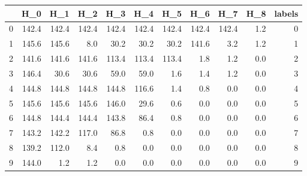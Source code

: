 \begin{tabular}{lrrrrrrrrrr}
\toprule
{} &    H\_0 &    H\_1 &    H\_2 &    H\_3 &    H\_4 &    H\_5 &    H\_6 &    H\_7 &  H\_8 &  labels \\
\midrule
0 &  142.4 &  142.4 &  142.4 &  142.4 &  142.4 &  142.4 &  142.4 &  142.4 &  1.2 &       0 \\
1 &  145.6 &  145.6 &    8.0 &   30.2 &   30.2 &   30.2 &  141.6 &    3.2 &  1.2 &       1 \\
2 &  141.6 &  141.6 &  141.6 &  113.4 &  113.4 &  113.4 &    1.8 &    1.2 &  0.0 &       2 \\
3 &  146.4 &   30.6 &   30.6 &   59.0 &   59.0 &    1.6 &    1.4 &    1.2 &  0.0 &       3 \\
4 &  144.8 &  144.8 &  144.8 &  144.8 &  116.6 &    1.4 &    0.8 &    0.0 &  0.0 &       4 \\
5 &  145.6 &  145.6 &  145.6 &  146.0 &   29.6 &    0.6 &    0.0 &    0.0 &  0.0 &       5 \\
6 &  144.8 &  144.4 &  144.4 &  143.8 &   86.4 &    0.8 &    0.0 &    0.0 &  0.0 &       6 \\
7 &  143.2 &  142.2 &  117.0 &   86.8 &    0.8 &    0.0 &    0.0 &    0.0 &  0.0 &       7 \\
8 &  139.2 &  112.0 &    8.4 &    0.8 &    0.0 &    0.0 &    0.0 &    0.0 &  0.0 &       8 \\
9 &  144.0 &    1.2 &    1.2 &    0.0 &    0.0 &    0.0 &    0.0 &    0.0 &  0.0 &       9 \\
\bottomrule
\end{tabular}
